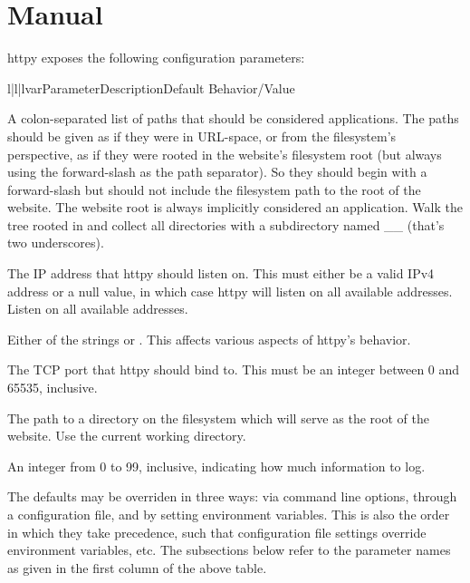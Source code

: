 \chapter{Manual}

httpy exposes the following configuration parameters:


\begin{tableiii}{l|l|l}{var}{Parameter}{Description}{Default Behavior/Value}

    {A colon-separated list of paths that should be considered applications. The
    paths should be given as if they were in URL-space, or from the filesystem's
    perspective, as if they were rooted in the website's filesystem root (but
    always using the forward-slash as the path separator). So they should begin
    with a forward-slash but should not include the filesystem path to the root
    of the website. The website root is always implicitly considered an
    application.}
    {Walk the tree rooted in  and collect all directories with a
    subdirectory named __ (that's two underscores).}

    {The IP address that httpy should listen on. This must either be a valid
    IPv4 address or a null value, in which case httpy will listen on all
    available addresses.}
    {Listen on all available addresses.}

    {Either of the strings  or . This affects
    various aspects of httpy's behavior.}
    {}

    {The TCP port that httpy should bind to. This must be an integer between 0
    and 65535, inclusive.}
    {}

    {The path to a directory on the filesystem which will serve as the root of
    the website.}
    {Use the current working directory.}

    {An integer from 0 to 99, inclusive, indicating how much information to
    log.}
    {}

\end{tableiii}

The defaults may be overriden in three ways: via command line options, through a
configuration file, and by setting environment variables. This is also the order
in which they take precedence, such that configuration file settings override
environment variables, etc. The subsections below refer to the parameter names
as given in the first column of the above table.




